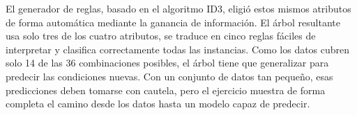 \documentclass[11pt,letterpaper]{article}
\begin{document}
El generador de reglas, basado en el algoritmo ID3, eligió estos mismos atributos de forma automática mediante la ganancia de información. El árbol resultante usa solo tres de los cuatro atributos, se traduce en cinco reglas fáciles de interpretar y clasifica correctamente todas las instancias. Como los datos cubren solo 14 de las 36 combinaciones posibles, el árbol tiene que generalizar para predecir las condiciones nuevas. Con un conjunto de datos tan pequeño, esas predicciones deben tomarse con cautela, pero el ejercicio muestra de forma completa el camino desde los datos hasta un modelo capaz de predecir.

\end{document}
